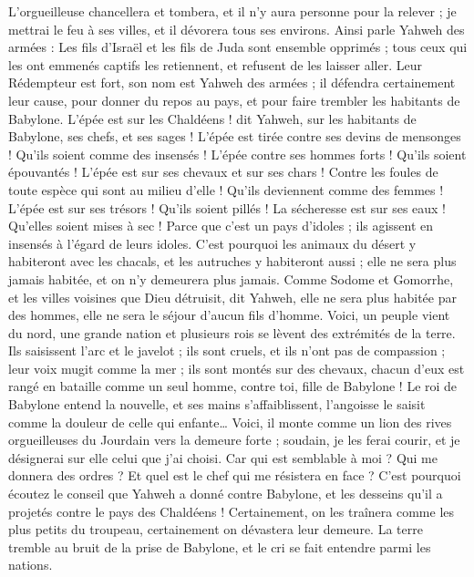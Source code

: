 \begin{multicols}{2}
L'orgueilleuse chancellera et tombera, et il n'y aura personne pour la relever ; je mettrai le feu à ses villes, et il dévorera tous ses environs.
Ainsi parle Yahweh des armées : Les fils d'Israël et les fils de Juda sont ensemble opprimés ; tous ceux qui les ont emmenés captifs les retiennent, et refusent de les laisser aller.
Leur Rédempteur est fort, son nom est Yahweh des armées ; il défendra certainement leur cause, pour donner du repos au pays, et pour faire trembler les habitants de Babylone.
L'épée est sur les Chaldéens ! dit Yahweh, sur les habitants de Babylone, ses chefs, et ses sages !
L'épée est tirée contre ses devins de mensonges ! Qu'ils soient comme des insensés ! L'épée contre ses hommes forts ! Qu'ils soient épouvantés !
L'épée est sur ses chevaux et sur ses chars ! Contre les foules de toute espèce qui sont au milieu d'elle ! Qu'ils deviennent comme des femmes ! L'épée est sur ses trésors ! Qu'ils soient pillés !
La sécheresse est sur ses eaux ! Qu'elles soient mises à sec ! Parce que c'est un pays d'idoles ; ils agissent en insensés à l'égard de leurs idoles.
C'est pourquoi les animaux du désert y habiteront avec les chacals, et les autruches y habiteront aussi ; elle ne sera plus jamais habitée, et on n'y demeurera plus jamais.
Comme Sodome et Gomorrhe, et les villes voisines que Dieu détruisit, dit Yahweh, elle ne sera plus habitée par des hommes, elle ne sera le séjour d'aucun fils d'homme.
Voici, un peuple vient du nord, une grande nation et plusieurs rois se lèvent des extrémités de la terre.
Ils saisissent l'arc et le javelot ; ils sont cruels, et ils n'ont pas de compassion ; leur voix mugit comme la mer ; ils sont montés sur des chevaux, chacun d'eux est rangé en bataille comme un seul homme, contre toi, fille de Babylone !
Le roi de Babylone entend la nouvelle, et ses mains s'affaiblissent, l'angoisse le saisit comme la douleur de celle qui enfante…
Voici, il monte comme un lion des rives orgueilleuses du Jourdain vers la demeure forte ; soudain, je les ferai courir, et je désignerai sur elle celui que j'ai choisi. Car qui est semblable à moi ? Qui me donnera des ordres ? Et quel est le chef qui me résistera en face ?
C'est pourquoi écoutez le conseil que Yahweh a donné contre Babylone, et les desseins qu'il a projetés contre le pays des Chaldéens ! Certainement, on les traînera comme les plus petits du troupeau, certainement on dévastera leur demeure.
La terre tremble au bruit de la prise de Babylone, et le cri se fait entendre parmi les nations.

\end{multicols}
